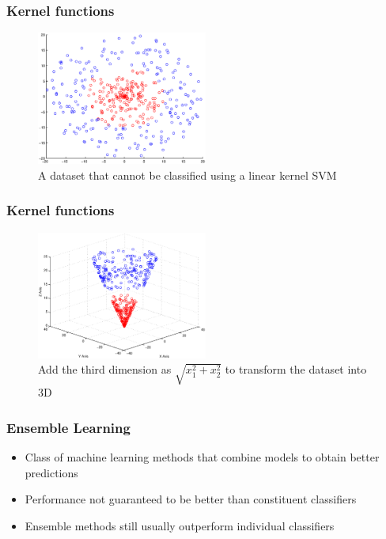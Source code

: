 \documentclass{beamer}
\begin{document}
    \begin{frame}
        \frametitle{Kernel functions}
        \begin{figure}
            \centering
            \includegraphics[width=0.5\textwidth]{figures/svm_non_linear_data.eps}
            \caption{A dataset that cannot be classified using a linear kernel SVM}
        \end{figure}
    \end{frame}
    
    \begin{frame}
        \frametitle{Kernel functions}
        \begin{figure}
            \centering
            \includegraphics[width=0.5\textwidth]{figures/svm_non_linear_data_3d.eps}
            \caption{Add the third dimension as $\sqrt{x_1^2 + x_2^2}$ to transform the dataset into 3D}
        \end{figure}
    \end{frame}
    
    \begin{frame}
        \frametitle{Ensemble Learning}
        \begin{itemize}
            \item{Class of machine learning methods that combine models to obtain better predictions}
            \item{Performance not guaranteed to be better than constituent classifiers}
            \item{Ensemble methods still usually outperform individual classifiers}
        \end{itemize}
    \end{frame}
    
\end{document}
